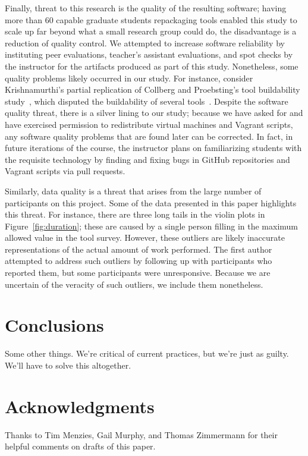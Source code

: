 \documentclass[10pt,conference]{IEEEtran}
\begin{document}
Finally, threat to this research is the quality
of the resulting software; 	
having more than 60 capable 
graduate students repackaging tools enabled this study 
to scale up far beyond what a small research group could 
do, the disadvantage is a reduction of quality control.
We attempted to increase software reliability by
instituting peer evaluations, teacher's assistant evaluations,
and spot checks by the instructor for the artifacts produced
as part of this study.
Nonetheless, some quality problems likely occurred in our study.
For instance, consider Krishnamurthi's partial replication of 
Collberg and Proebsting's tool buildability study~\cite{collberg2016repeatability},
which disputed the buildability of several tools~\cite{skRep}.
Despite the software quality threat, there is a silver lining
to our study; because we have asked for and have exercised 
permission to redistribute virtual machines and Vagrant scripts,
any software quality problems that are found later can be 
corrected.
In fact, in future iterations of the course, the instructor 
plans on familiarizing students with the requisite technology
by finding and fixing bugs in GitHub repositories and 
Vagrant scripts via pull requests.

Similarly, data quality is a threat that arises from the large
number of participants on this project.
Some of the data presented in this paper highlights this threat.
For instance, there are three long tails in the violin plots in 
Figure~\ref{fig:duration}; these are caused by a single person 
filling in the maximum allowed value in the tool survey.
However, these outliers are likely inaccurate representations
of the actual amount of work performed.
The first author attempted to address such outliers by following
up with participants who reported them, but some participants 
were unresponsive.
Because we are uncertain of the veracity of such outliers,
we include them nonetheless.

\section{Conclusions}

Some other things.
We're critical of current practices, but we're just as guilty.
We'll have to solve this altogether.

\section*{Acknowledgments}

Thanks to Tim Menzies, Gail Murphy, and Thomas Zimmermann
for their helpful comments on drafts of this paper.  


 
\end{document}
